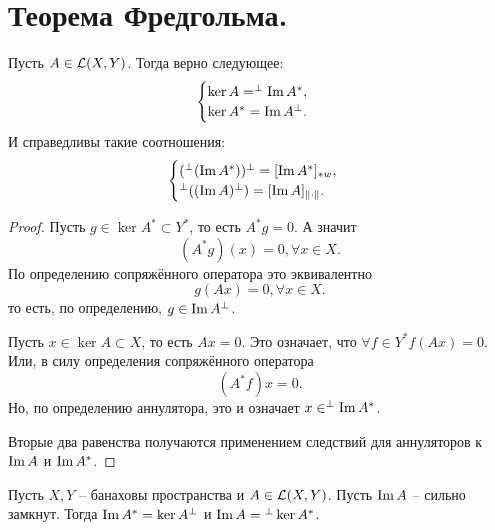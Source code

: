 \section{Теорема Фредгольма.}
\begin{theorem}[Фредгольм]\label{th:fredhgolm}
    Пусть $A \in \mathcal{L}(X, Y)$.
    Тогда верно следующее:
    \[
        \begin{cases}
            \ker A =  ^{\perp}\operatorname{Im} A^*, \\
            \ker A^* = \operatorname{Im} A^{\perp}.
        \end{cases}
    \]
    И справедливы такие соотношения:
    \[
        \begin{cases}
        (^\perp(\operatorname{Im} A^*))^{\perp} = [\operatorname{Im} A^*]_{*w}, \\
        ^\perp((\operatorname{Im} A)^\perp) = [\operatorname{Im} A]_{\|\cdot\|}.
        \end{cases}
    \]
\end{theorem}
\begin{proof}
    Пусть $g \in \ker A^* \subset Y^*$, то есть $A^* g = 0$.
    А значит
    \[
        (A^* g)(x) = 0, \forall x \in X.
    \]
    По определению сопряжённого оператора это эквивалентно
    \[
        g(Ax) = 0, \forall x \in X.
    \]
    то есть, по определению, $g \in \operatorname{Im} A^\perp$.

    Пусть $x \in \ker A \subset X$, то есть $Ax = 0$.
    Это означает, что $\forall f \in Y^* f(Ax) = 0$.
    Или, в силу определения сопряжённого оператора
    \[
        (A^* f)x = 0.
    \]
    Но, по определению аннулятора, это и означает $x \in ^\perp \operatorname{Im} A^*$.

    Вторые два равенства получаются применением следствий для аннуляторов к $\operatorname{Im} A$ и $\operatorname{Im} A^*$.
\end{proof}
\begin{theorem}\label{th:closability}
    Пусть $X, Y$ -- банаховы пространства и $A \in \mathcal{L}(X, Y)$.
    Пусть $\operatorname{Im} A$ -- сильно замкнут.
    Тогда $\operatorname{Im} A^* = \ker A^\perp$ и $\operatorname{Im} A = {}^\perp \ker A^*$.
\end{theorem}
